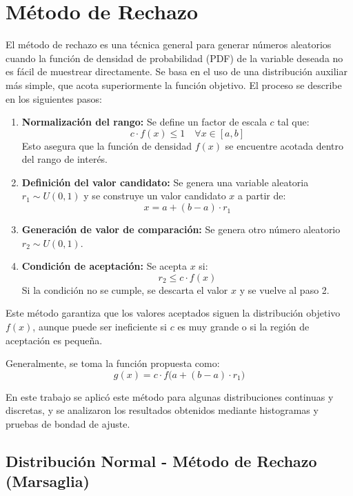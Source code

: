 \documentclass[11pt]{article}
\begin{document}
\section{Método de Rechazo}

El método de rechazo es una técnica general para generar números aleatorios cuando la función de densidad de probabilidad (PDF) de la variable deseada no es fácil de muestrear directamente. Se basa en el uso de una distribución auxiliar más simple, que acota superiormente la función objetivo. El proceso se describe en los siguientes pasos:

\begin{enumerate}
    \item \textbf{Normalización del rango:} Se define un factor de escala $c$ tal que:
    \[
    c \cdot f(x) \leq 1 \quad \forall x \in [a, b]
    \]
    Esto asegura que la función de densidad $f(x)$ se encuentre acotada dentro del rango de interés.

    \item \textbf{Definición del valor candidato:} Se genera una variable aleatoria $r_1 \sim U(0,1)$ y se construye un valor candidato $x$ a partir de:
    \[
    x = a + (b - a) \cdot r_1
    \]

    \item \textbf{Generación de valor de comparación:} Se genera otro número aleatorio $r_2 \sim U(0,1)$.

    \item \textbf{Condición de aceptación:} Se acepta $x$ si:
    \[
    r_2 \leq c \cdot f(x)
    \]
    Si la condición no se cumple, se descarta el valor $x$ y se vuelve al paso 2.
\end{enumerate}

Este método garantiza que los valores aceptados siguen la distribución objetivo $f(x)$, aunque puede ser ineficiente si $c$ es muy grande o si la región de aceptación es pequeña.

Generalmente, se toma la función propuesta como:
\[
g(x) = c \cdot f\big(a + (b - a) \cdot r_1\big)
\]

En este trabajo se aplicó este método para algunas distribuciones continuas y discretas, y se analizaron los resultados obtenidos mediante histogramas y pruebas de bondad de ajuste.

\subsection*{Distribución Normal - Método de Rechazo (Marsaglia)}
\end{document}

